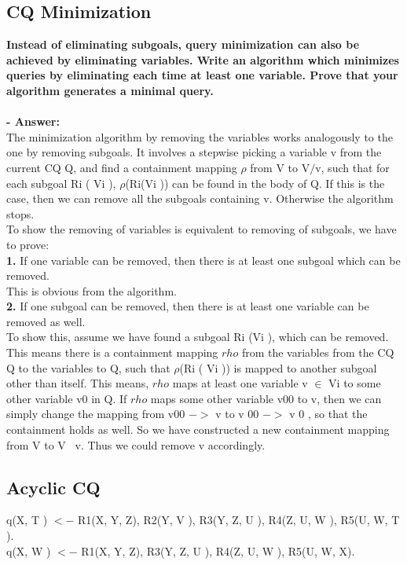 \documentclass{article}
\begin{document}
\subsection{CQ Minimization}
\textbf{Instead of eliminating subgoals, query minimization can also be achieved by eliminating variables. Write an algorithm which minimizes queries by eliminating each time at least one variable. Prove that your algorithm generates a minimal query.\\\\}
\textbf{- Answer:}\\
The minimization algorithm by removing the variables works analogously to the one by removing subgoals. It involves a stepwise picking a variable v from the current CQ Q, and find a containment mapping $\rho$ from V to V$/$v,  such that for each subgoal Ri ( Vi ), $\rho$(Ri(Vi )) can be found in the body of Q. If this is the case, then we can remove all the subgoals containing v. Otherwise the algorithm stops.\\
To show the removing of variables is equivalent to removing of subgoals, we have to prove:\\ \textbf{1.} If one variable can be removed, then there is at least one subgoal which can be removed.\\ This is obvious from the algorithm. \\
\textbf{2.} If one subgoal can be removed, then there is at least one variable can be removed as well. \\
To show this, assume we have found a subgoal Ri (Vi ), which can be removed. This means there is a containment mapping $rho$ from the variables from the CQ Q to the variables to Q, such that $\rho$(Ri ( Vi )) is mapped to another subgoal other than itself. This means, $rho$ maps at least one variable v $\in$ Vi to some other variable v0 in Q. If $rho$ maps some other variable v00 to v, then we can simply change the mapping from
v00 $->$ v to v 00 $->$ v 0 , so that the containment holds as well. So we have constructed a new containment mapping from V to V \ v. Thus we could remove v accordingly.

\subsection{Acyclic CQ}
q(X, T ) $<-$ R1(X, Y, Z), R2(Y, V ), R3(Y, Z, U ), R4(Z, U, W ), R5(U, W, T ).\\
q(X, W ) $<-$ R1(X, Y, Z), R3(Y, Z, U ), R4(Z, U, W ), R5(U, W, X).
\end{document}
